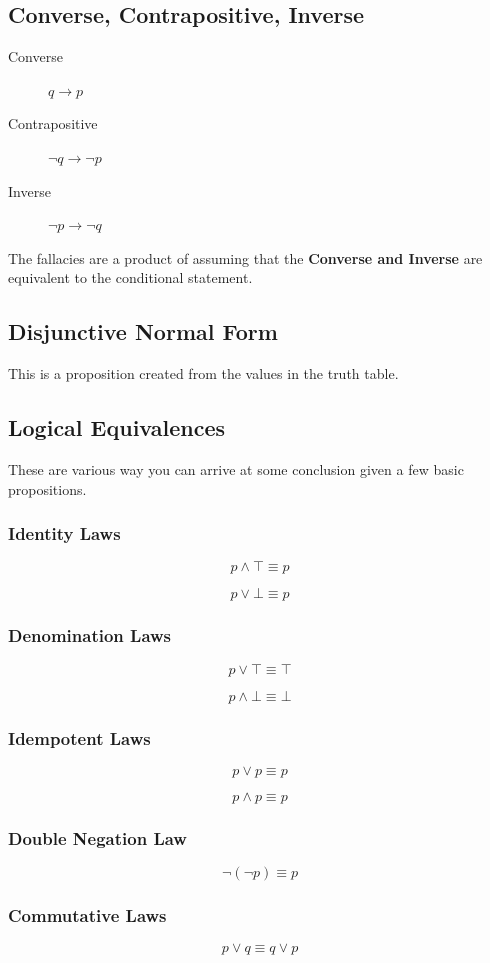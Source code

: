 \documentclass[11pt]{article}
\begin{document}
\subsection{Converse, Contrapositive, Inverse}
\label{sec:org32e7bf7}
\begin{description}
\item[{Converse}] \(q \to p\)
\item[{Contrapositive}] \(\neg q \to \neg p\)
\item[{Inverse}] \(\neg p \to \neg q\)
\end{description}

The fallacies are a product of assuming that the \textbf{Converse and Inverse} are equivalent to the conditional statement.
\subsection{Disjunctive Normal Form}
\label{sec:org7b0dfc4}
This is a proposition created from the values in the truth table.

\subsection{Logical Equivalences}
\label{sec:org888a448}
These are various way you can arrive at some conclusion given a few basic propositions.
\subsubsection{Identity Laws}
\label{sec:org17e628d}
\[
p \land \top \equiv p
\]

\[
p \lor \bot \equiv p
\]
\subsubsection{Denomination Laws}
\label{sec:org8e6edb1}
\[
p \lor \top \equiv \top
\]

\[
p \land \bot \equiv \bot
\]
\subsubsection{Idempotent Laws}
\label{sec:org805a65b}
\[
p \lor p \equiv p
\]

\[
p \land p \equiv p
\]
\subsubsection{Double Negation Law}
\label{sec:org305efcf}
\[
\neg ( \neg p) \equiv p
\]
\subsubsection{Commutative Laws}
\label{sec:org3f6b4c2}
\[
p \lor q \equiv q \lor p
\]
\end{document}
